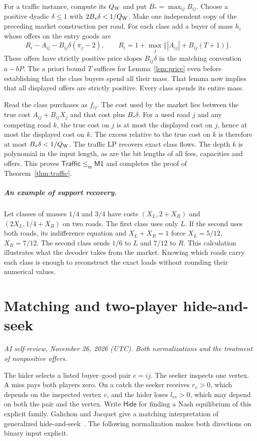 \documentclass[11pt,oneside,openany,notitlepage]{report}
\newcommand{\Market}{\mathsf{M1}}
\newcommand{\Traffic}{\mathsf{Traffic}}
\newcommand{\dd}{\mathrel{\leq_{\mathrm m}}}
\newcommand{\reviewdate}{November 26, 2026 (UTC)}
\newcommand{\reviewmark}[1]{\par\nopagebreak[4]\noindent
  {\footnotesize\itshape AI self-review, \reviewdate. #1\par}\nobreak\smallskip}
\begin{document}
For a traffic instance, compute its \(Q_{\rm W}\) and put \(B_*=\max_{ij}B_{ij}\).
Choose a positive dyadic \(\delta\le1\) with \(2B_*\delta<1/Q_{\rm W}\).
Make one independent copy of the preceding market construction per road.
For each class add a buyer of mass \(h_i\) whose offers on the entry goods
are
\[
 R_i-A_{ij}-B_{ij}\delta(\pi_j-2),\qquad
 R_i=1+\max_j\{|A_{ij}|+B_{ij}(T+1)\}.
\]
These offers have strictly positive price slopes \(B_{ij}\delta\) in
the matching convention \(a-bP\). The a priori bound \(T\) suffices for
Lemma~\ref{lem:price} even before establishing that the class buyers spend
all their mass. That lemma now implies that all displayed offers are
strictly positive. Every class spends its entire mass.

Read the class purchases as \(f_{ij}\). The cost used by the market lies
between the true cost \(A_{ij}+B_{ij}X_j\) and that cost plus \(B_*\delta\).
For a used road \(j\) and any competing road \(k\), the true cost on \(j\)
is at most the displayed cost on \(j\), hence at most the displayed cost
on \(k\). The excess relative to the true cost on \(k\) is therefore at
most \(B_*\delta<1/Q_{\rm W}\). The traffic LP recovers exact class flows.
The depth \(k\) is polynomial in the input length, as are the bit lengths of
all fees, capacities and offers. This proves \(\Traffic\dd\Market\) and
completes the proof of Theorem~\ref{thm:traffic}.

\paragraph{An example of support recovery.}
Let classes of masses \(1/4\) and \(3/4\) have costs
\((X_L,2+X_R)\) and \((2X_L,1/4+X_R)\) on two roads. The first class uses
only \(L\). If the second uses both roads, its indifference equation and
\(X_L+X_R=1\) force \(X_L=5/12\), \(X_R=7/12\). The second class sends
\(1/6\) to \(L\) and \(7/12\) to \(R\). This calculation illustrates what the
decoder takes from the market. Knowing which roads carry each class is
enough to reconstruct the exact loads without rounding their numerical values.

\chapter{Matching and two-player hide-and-seek}\label{sec:matching-links}
\reviewmark{Both normalizations and the treatment of nonpositive offers.}
The hider selects a listed buyer--good pair \(e=ij\). The seeker inspects
one vertex. A miss pays both players zero. On a catch the seeker receives
\(r_v>0\), which depends on the inspected vertex \(v\), and the hider
loses \(l_{ev}>0\), which may depend on both the pair and the vertex.
Write \(\mathsf{Hide}\) for finding a Nash equilibrium of this explicit
family. Galichon and Jacquet give a matching interpretation of generalized
hide-and-seek~\cite[Theorem~1]{gj}. The following normalization makes both
directions on binary input explicit.
\end{document}
